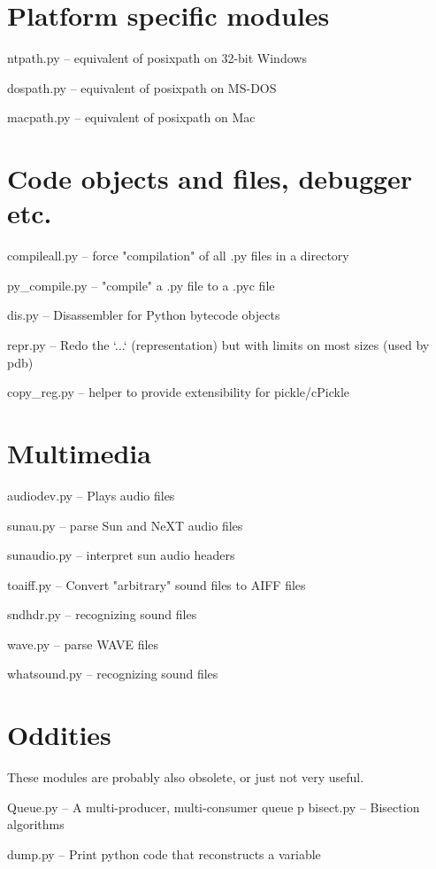 \section{Platform specific modules}

ntpath.py -- equivalent of posixpath on 32-bit Windows

dospath.py -- equivalent of posixpath on MS-DOS

macpath.py -- equivalent of posixpath on Mac


\section{Code objects and files, debugger etc.}

compileall.py -- force "compilation" of all .py files in a directory

py_compile.py -- "compile" a .py file to a .pyc file

dis.py -- Disassembler for Python bytecode objects

repr.py -- Redo the `...` (representation) but with limits on most
sizes (used by pdb)

copy_reg.py -- helper to provide extensibility for pickle/cPickle


\section{Multimedia}

audiodev.py -- Plays audio files

sunau.py -- parse Sun and NeXT audio files

sunaudio.py -- interpret sun audio headers

toaiff.py -- Convert "arbitrary" sound files to AIFF files

sndhdr.py -- recognizing sound files

wave.py -- parse WAVE files

whatsound.py -- recognizing sound files


\section{Oddities}

These modules are probably also obsolete, or just not very useful.

Queue.py -- A multi-producer, multi-consumer queue
p
bisect.py -- Bisection algorithms

dump.py -- Print python code that reconstructs a variable

